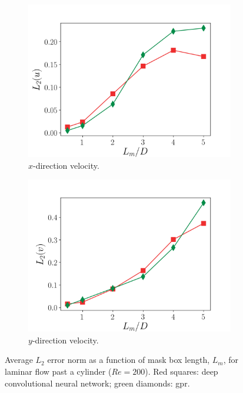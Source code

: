 \documentclass[review]{elsarticle}
\begin{document}
\begin{figure}[!tbp]%
  \centering%
  \begin{subfigure}[t]{0.48\textwidth}%
    \includegraphics[width=\textwidth]{./figs/cyl_error_u.png}%
    \caption{$x$-direction velocity.}\label{fig:cyl_error_u}%
  \end{subfigure}%
  \hfill%
  \begin{subfigure}[t]{0.48\textwidth}%
    \includegraphics[width=\textwidth]{./figs/cyl_error_v.png}%
    \caption{$y$-direction velocity.}\label{fig:cyl_error_v}%
  \end{subfigure}%
  \caption{Average $L_2$ error norm as a function of mask box length,
    $L_m$, for laminar flow past a cylinder ($Re=200$). Red squares:
    deep convolutional neural network; green diamonds:
    \gls{gpr}.}\label{fig:cyl_error}%
\end{figure}%
\end{document}
